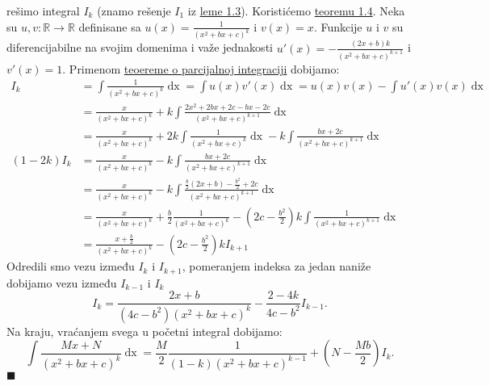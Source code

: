 \documentclass{article}
\DeclareMathOperator{\dx}{dx}
\begin{document}
rešimo integral $I_k$ (znamo rešenje $I_1$ iz \hyperref[lema_1.3]{leme 1.3}). Koristićemo \hyperref[teorema_1.4]{teoremu 1.4}.
Neka su $u,v:\mathbb{R}\longrightarrow\mathbb{R}$ definisane sa $\displaystyle u\left(x\right)=\frac{1}{\left(x^2+bx+c\right)^k}$
i $v\left(x\right)=x$. Funkcije $u$ i $v$ su diferencijabilne na svojim domenima i
važe jednakosti $\displaystyle u'\left(x\right)=-\frac{\left(2x+b\right)k}{\left(x^2+bx+c\right)^{k+1}}$ i $v'\left(x\right)=1$.
Primenom \hyperref[teorema_1.4]{teoereme o parcijalnoj integraciji} dobijamo:
\begin{align*}
    I_k                  & =\int\frac{1}{\left(x^2+bx+c\right)^k}\dx =\int u\left(x\right)v'\left(x\right)\dx =u\left(x\right)v\left(x\right)-\int u'\left(x\right)v\left(x\right)\dx    \\
                         & =\frac{x}{\left(x^2+bx+c\right)^k}+k\int\frac{2x^2+2bx+2c-bx-2c}{\left(x^2+bx+c\right)^{k+1}} \dx                                                             \\
                         & =\frac{x}{\left(x^2+bx+c\right)^k}+2k\int\frac{1}{\left(x^2+bx+c\right)^k}\dx-k\int\frac{bx+2c}{\left(x^2+bx+c\right)^{k+1}} \dx                              \\
    \left(1-2k\right)I_k & =\frac{x}{\left(x^2+bx+c\right)^k}-k\int\frac{bx+2c}{\left(x^2+bx+c\right)^{k+1}} \dx                                                                         \\
                         & =\frac{x}{\left(x^2+bx+c\right)^k}-k\int\frac{\frac{b}{2}\left(2x+b\right)-\frac{b^2}{2}+2c}{\left(x^2+bx+c\right)^{k+1}} \dx                                 \\
                         & =\frac{x}{\left(x^2+bx+c\right)^k}+\frac{b}{2}\frac{1}{\left(x^2+bx+c\right)^{k}}-\left(2c-\frac{b^2}{2}\right)k\int\frac{1}{\left(x^2+bx+c\right)^{k+1}} \dx \\
                         & =\frac{x+\frac{b}{2}}{\left(x^2+bx+c\right)^k}-\left(2c-\frac{b^2}{2}\right)kI_{k+1}
\end{align*}
Odredili smo vezu između $I_k$ i $I_{k+1}$, pomeranjem indeksa za jedan
naniže dobijamo vezu između $I_{k-1}$ i $I_k$
$$I_k =\frac{2x+b}{\left(4c-b^2\right)\left(x^2+bx+c\right)^k}-\frac{2-4k}{4c-b^2}I_{k-1}.$$
Na kraju, vraćanjem svega u početni integral dobijamo:
$$    \int \frac{Mx+N}{\left(x^2+bx+c\right)^k}\dx=\frac{M}{2}\frac{1}{\left(1-k\right)\left(x^2+bx+c\right)^{k-1}}+\left(N-\frac{Mb}{2}\right)I_k.$$
\null\hfill $\blacksquare$\par
\end{document}

